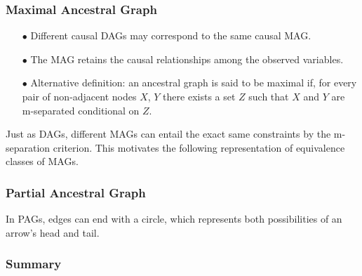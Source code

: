 \documentclass{beamer}
\begin{document}
\begin{frame}
    \frametitle{Maximal Ancestral Graph}
    \begin{itemize}
        \item[$\bullet$] Different causal DAGs may correspond to the same causal MAG.
        \item[$\bullet$] The MAG retains the causal relationships among the observed variables.
        \item[$\bullet$] Alternative definition: an ancestral graph is said to be maximal if, for every
        pair of non-adjacent nodes $X$, $Y$ there exists a set $Z$
        such that $X$ and $Y$ are m-separated conditional on $Z$.
    \end{itemize}
    Just as DAGs, different MAGs can entail the exact same constraints by the m-separation criterion. This motivates the following 
    representation of equivalence classes of MAGs. 
\end{frame}

\begin{frame}
    \frametitle{Partial Ancestral Graph}
    \begin{flushleft}
        In PAGs, edges can end with a circle, which represents both possibilities of an arrow's head and tail.
    \end{flushleft}
\end{frame}

\begin{frame}
    \frametitle{Summary}
\end{frame}
\end{document}

